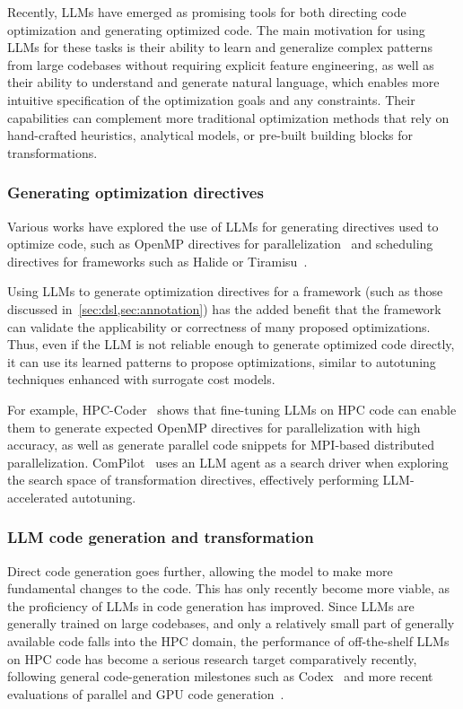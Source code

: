 Recently, LLMs have emerged as promising tools for both directing code optimization and generating optimized code. The main motivation for using LLMs for these tasks is their ability to learn and generalize complex patterns from large codebases without requiring explicit feature engineering, as well as their ability to understand and generate natural language, which enables more intuitive specification of the optimization goals and any constraints. Their capabilities can complement more traditional optimization methods that rely on hand-crafted heuristics, analytical models, or pre-built building blocks for transformations.


\subsubsection{Generating optimization directives}\label{sec:llm-generating-directives}

Various works have explored the use of LLMs for generating directives used to optimize code, such as OpenMP directives for parallelization~\cite{nichols2024hpc} and scheduling directives for frameworks such as Halide or Tiramisu~\cite{merouani2025agentic}.

Using LLMs to generate optimization directives for a framework (such as those discussed in~\cref{sec:dsl,sec:annotation}) has the added benefit that the framework can validate the applicability or correctness of many proposed optimizations. Thus, even if the LLM is not reliable enough to generate optimized code directly, it can use its learned patterns to propose optimizations, similar to autotuning techniques enhanced with surrogate cost models.

For example, HPC-Coder~\cite{nichols2024hpc} shows that fine-tuning LLMs on HPC code can enable them to generate expected OpenMP directives for parallelization with high accuracy, as well as generate parallel code snippets for MPI-based distributed parallelization. ComPilot~\cite{merouani2025agentic} uses an LLM agent as a search driver when exploring the search space of transformation directives, effectively performing LLM-accelerated autotuning.


\subsubsection{LLM code generation and transformation}\label{sec:llm-code-generation}

Direct code generation goes further, allowing the model to make more fundamental changes to the code. This has only recently become more viable, as the proficiency of LLMs in code generation has improved. Since LLMs are generally trained on large codebases, and only a relatively small part of generally available code falls into the HPC domain, the performance of off-the-shelf LLMs on HPC code has become a serious research target comparatively recently, following general code-generation milestones such as Codex~\cite{chen2021evaluating} and more recent evaluations of parallel and GPU code generation~\cite{nichols2024can,godoy2024large}.

